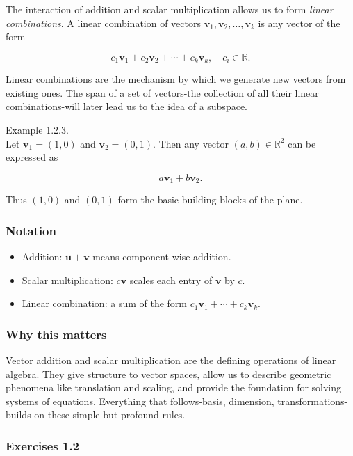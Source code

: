 \documentclass[
  12pt,
  a4paper,
]{article}
\begin{document}
The interaction of addition and scalar multiplication allows us to form
\emph{linear combinations}. A linear combination of vectors
\(\mathbf{v}_1, \mathbf{v}_2, \dots, \mathbf{v}_k\) is any vector of the
form

\[c_1 \mathbf{v}_1 + c_2 \mathbf{v}_2 + \cdots + c_k \mathbf{v}_k, \quad c_i \in \mathbb{R}.\]

Linear combinations are the mechanism by which we generate new vectors
from existing ones. The span of a set of vectors-the collection of all
their linear combinations-will later lead us to the idea of a subspace.

Example 1.2.3.\\
Let \(\mathbf{v}_1 = (1,0)\) and \(\mathbf{v}_2 = (0,1)\). Then any
vector \((a,b)\in\mathbb{R}^2\) can be expressed as

\[a\mathbf{v}_1 + b\mathbf{v}_2.\]

Thus \((1,0)\) and \((0,1)\) form the basic building blocks of the
plane.

\subsubsection{Notation}\label{notation-2}

\begin{itemize}
\item
  Addition: \(\mathbf{u} + \mathbf{v}\) means component-wise addition.
\item
  Scalar multiplication: \(c\mathbf{v}\) scales each entry of
  \(\mathbf{v}\) by \(c\).
\item
  Linear combination: a sum of the form
  \(c_1 \mathbf{v}_1 + \cdots + c_k \mathbf{v}_k\).
\end{itemize}

\subsubsection{Why this matters}\label{why-this-matters}

Vector addition and scalar multiplication are the defining operations of
linear algebra. They give structure to vector spaces, allow us to
describe geometric phenomena like translation and scaling, and provide
the foundation for solving systems of equations. Everything that
follows-basis, dimension, transformations-builds on these simple but
profound rules.

\subsubsection{Exercises 1.2}\label{exercises-12}
\end{document}
